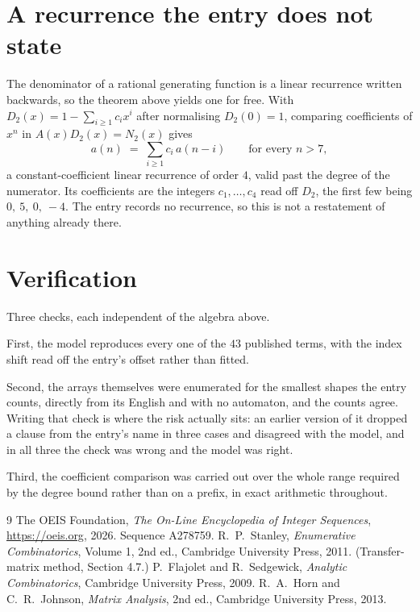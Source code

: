 \documentclass[11pt,a4paper]{article}
\theoremstyle{plain}
\theoremstyle{definition}
\begin{document}
\section{A recurrence the entry does not state}

The denominator of a rational generating function is a linear recurrence written backwards, so
the theorem above yields one for free. With $D_2(x)=1-\sum_{i\ge1}c_ix^i$ after normalising
$D_2(0)=1$, comparing coefficients of $x^n$ in $A(x)D_2(x)=N_2(x)$ gives
\[
a(n)\;=\;\sum_{i\ge1}c_i\,a(n-i)\qquad\text{for every }n>7,
\]
a constant-coefficient linear recurrence of order $4$, valid past the degree of the
numerator. Its coefficients are the integers $c_1,\dots,c_{4}$ read off $D_2$, the first few being $0,\ 5,\ 0,\ -4$. The entry records no recurrence, so this is not a restatement of anything
already there.

\section{Verification}

Three checks, each independent of the algebra above.

First, the model reproduces every one of the $43$ published terms, with the index shift
read off the entry's offset rather than fitted.

Second, the arrays themselves were enumerated for the smallest shapes the entry counts,
directly from its English and with no automaton, and the counts agree. Writing that check is
where the risk actually sits: an earlier version of it dropped a clause from the entry's name
in three cases and disagreed with the model, and in all three the check was wrong and the model
was right.

Third, the coefficient comparison was carried out over the whole range required by the degree
bound rather than on a prefix, in exact arithmetic throughout.

\begin{thebibliography}{9}
 The OEIS Foundation, \emph{The On-Line Encyclopedia of Integer
Sequences}, \url{https://oeis.org}, 2026. Sequence A278759.
 R.~P.~Stanley, \emph{Enumerative Combinatorics}, Volume 1, 2nd ed.,
Cambridge University Press, 2011. (Transfer-matrix method, Section 4.7.)
 P.~Flajolet and R.~Sedgewick, \emph{Analytic Combinatorics}, Cambridge
University Press, 2009.
 R.~A.~Horn and C.~R.~Johnson, \emph{Matrix Analysis}, 2nd ed., Cambridge
University Press, 2013.
\end{thebibliography}
\end{document}
